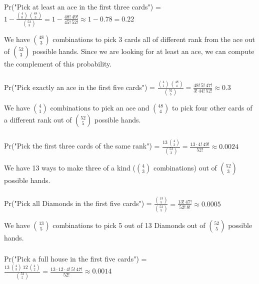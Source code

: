 \documentclass[11pt]{article}
\begin{document}
\subsubsection{}
Pr("Pick at least an ace in the first three cards") = $ \displaystyle  1 - \frac{\binom{4}{0} \ \binom{48}{3}}{\binom{52}{3}} =
1 - \frac{48! \ 49!}{45! \ 52!} \approx 1 - 0.78 = 0.22 $

\bigskip
We have $ \displaystyle \binom{48}{3}$ combinations to pick 3 cards all of different rank from the ace out of $ \displaystyle \binom{52}{3}$ possible hands.
Since we are looking for at least an ace, we can compute the complement of this probability.

\subsubsection{}
Pr("Pick exactly an ace in the first five cards") = $ \displaystyle \frac{\binom{4}{1} \ \binom{48}{4}}{\binom{52}{5}} =
\frac{48! \ 5! \ 47!}{3! \ 44! \ 52!} \approx 0.3 $

\bigskip
We have $ \displaystyle \binom{4}{1}$ combinations to pick an ace and $ \displaystyle \binom{48}{4}$ to pick four other cards of a different rank out of
$ \displaystyle \binom{52}{5}$ possible hands.


\subsubsection{}
Pr("Pick the first three cards of the same rank") = $ \displaystyle \frac{13 \ \binom{4}{3}}{\binom{52}{3}} = \frac{13 \cdot 4! \ 49!}{52!} \approx 0.0024 $

\bigskip
We have 13 ways to make three of a kind ($ \displaystyle \binom{4}{3}$ combinations) out of $ \displaystyle \binom{52}{3}$ possible hands.


\subsubsection{}
Pr("Pick all Diamonds in the first five cards") = $ \displaystyle \frac{\binom{13}{5}}{\binom{52}{5}} = \frac{13! \ 47!}{52! \ 8!} \approx 0.0005 $

\bigskip
We have $ \displaystyle \binom{13}{5}$ combinations to pick 5 out of 13 Diamonds out of $ \displaystyle \binom{52}{5}$ possible hands.


\subsubsection{}
Pr("Pick a full house in the first five cards") = $ \displaystyle \frac{13 \ \binom{4}{3} \ 12 \ \binom{4}{2}}{\binom{52}{5}} =
\frac{13 \cdot 12 \cdot 4! \ 5! \ 47!}{52!} \approx 0.0014 $
\end{document}

